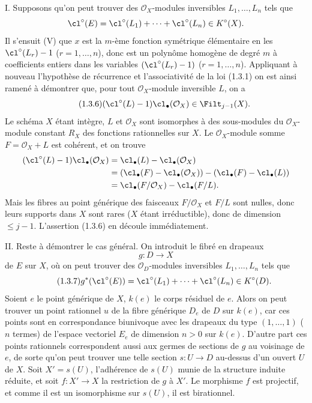 I. Supposons qu'on peut trouver des $\mathcal O_X$-modules inversibles $L_1,\ldots,L_n$ tels que
\[
\cl^\circ(E)=\cl^\circ(L_1)+\cdots+\cl^\circ(L_n)\in K^\circ(X).
\]
Il s'ensuit (V) que $x$ est la $m$-ème fonction symétrique élémentaire en les $\cl^\circ(L_r)-1$ ($r=1,\ldots,n$), donc est un polynôme homogène de degré $m$ à coefficients entiers dans les variables $(\cl^\circ(L_r)-1)$ ($r=1,\ldots,n$). Appliquant à nouveau l'hypothèse de récurrence et l'associativité de la loi (1.3.1) on est ainsi ramené à démontrer que, pour tout $\mathcal O_X$-module inversible $L$, on a
\begin{equation}\tag{1.3.6}
(\cl^\circ(L)-1)\cl_\bullet(\mathcal O_X)\in\Filt_{j-1}(X).
\end{equation}
Le schéma $X$ étant intègre, $L$ et $\mathcal O_X$ sont isomorphes à des sous-modules du $\mathcal O_X$-module constant $R_X$ des fonctions rationnelles sur $X$. Le $\mathcal O_X$-module somme $F=\mathcal O_X+L$ est cohérent, et on trouve
\begin{align*}
(\cl^\circ(L)-1)\cl_\bullet(\mathcal O_X)
&=\cl_\bullet(L)-\cl_\bullet(\mathcal O_X)\\
&=(\cl_\bullet(F)-\cl_\bullet(\mathcal O_X))-(\cl_\bullet(F)-\cl_\bullet(L))\\
&=\cl_\bullet(F/\mathcal O_X)-\cl_\bullet(F/L).
\end{align*}
Mais les fibres au point générique des faisceaux $F/\mathcal O_X$ et $F/L$ sont nulles, donc leurs supports dans $X$ sont rares ($X$ étant irréductible), donc de dimension $\leq j-1$. L'assertion (1.3.6) en découle immédiatement.

II. Reste à démontrer le cas général. On introduit le fibré en drapeaux
\[
g:D\longrightarrow X
\]
de $E$ sur $X$, où on peut trouver des $\mathcal O_D$-modules inversibles $L_1,\ldots,L_n$ tels que
\begin{equation}\tag{1.3.7}
g^*(\cl^\circ(E))=\cl^\circ(L_1)+\cdots+\cl^\circ(L_n)\in K^\circ(D).
\end{equation}
Soient $e$ le point générique de $X$, $k(e)$ le corps résiduel de $e$. Alors on peut trouver un point rationnel $u$ de la fibre générique $D_e$ de $D$ sur $k(e)$, car ces points sont en correspondance biunivoque avec les drapeaux du type $(1,\ldots,1)$ ($n$ termes) de l'espace vectoriel $E_e$ de dimension $n>0$ sur $k(e)$. D'autre part ces points rationnels correspondent aussi aux germes de sections de $g$ au voisinage de $e$, de sorte qu'on peut trouver une telle section $s:U\to D$ au-dessus d'un ouvert $U$ de $X$. Soit $X'=s(U)$, l'adhérence de $s(U)$ munie de la structure induite réduite, et soit $f:X'\to X$ la restriction de $g$ à $X'$. Le morphisme $f$ est projectif, et comme il est un isomorphisme sur $s(U)$, il est birationnel.


